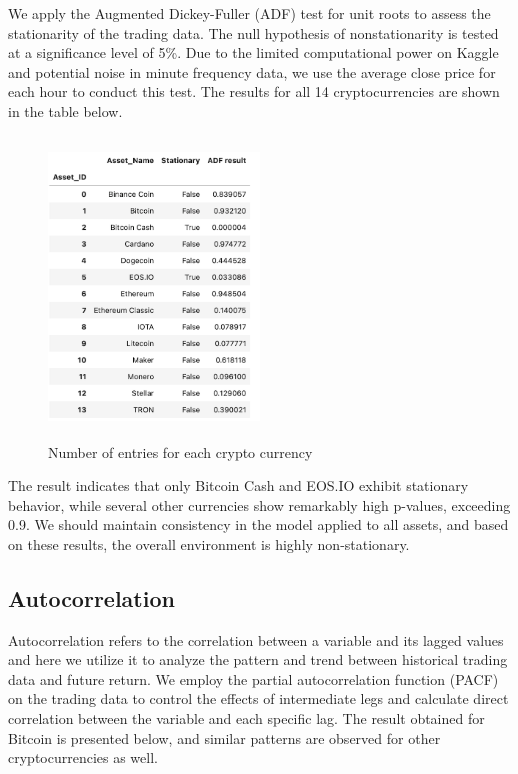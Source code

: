\documentclass{article}
\begin{document}
We apply the Augmented Dickey-Fuller (ADF) test for unit roots to assess the stationarity of the trading data. The null hypothesis of nonstationarity is tested at a significance level of 5\%. Due to the limited computational power on Kaggle and potential noise in minute frequency data, we use the average close price for each hour to conduct this test. The results for all 14 cryptocurrencies are shown in the table below.

\begin{figure}[H]
	\centering
	\includegraphics[width=0.5\textwidth, height=8cm]{Data/ADF test result.png}
	\caption{Number of entries for each crypto currency}
\end{figure}

The result indicates that only Bitcoin Cash and EOS.IO exhibit stationary behavior, while several other currencies show remarkably high p-values, exceeding 0.9. We should maintain consistency in the model applied to all assets, and based on these results, the overall environment is highly non-stationary.

\subsection{Autocorrelation}

Autocorrelation refers to the correlation between a variable and its lagged values and here we utilize it to analyze the pattern and trend between historical trading data and future return. We employ the partial autocorrelation function (PACF) on the trading data to control the effects of intermediate legs and calculate direct correlation between the variable and each specific lag. The result obtained for Bitcoin is presented below, and similar patterns are observed for other cryptocurrencies as well.
\end{document}
